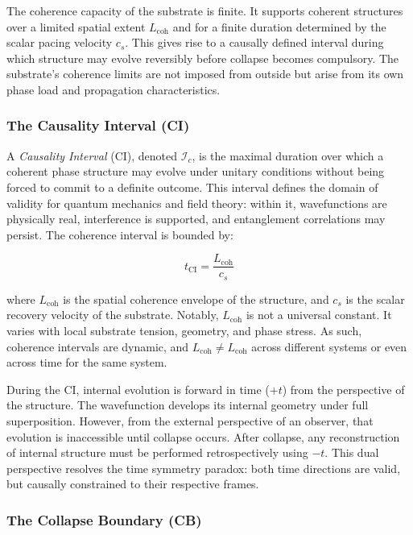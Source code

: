 \documentclass[preprints,article,submit,pdftex,moreauthors]{Definitions/mdpi}
\begin{document}
The coherence capacity of the substrate is finite. It supports coherent structures over a limited spatial extent \( L_{\text{coh}} \) and for a finite duration determined by the scalar pacing velocity \( c_s \). This gives rise to a causally defined interval during which structure may evolve reversibly before collapse becomes compulsory. The substrate’s coherence limits are not imposed from outside but arise from its own phase load and propagation characteristics.

\subsubsection{The Causality Interval (CI)}

A \textit{Causality Interval} (CI), denoted \( \mathcal{I}_c \), is the maximal duration over which a coherent phase structure may evolve under unitary conditions without being forced to commit to a definite outcome. This interval defines the domain of validity for quantum mechanics and field theory: within it, wavefunctions are physically real, interference is supported, and entanglement correlations may persist. The coherence interval is bounded by:

\[
t_{\text{CI}} = \frac{L_{\text{coh}}}{c_s}
\]

where \( L_{\text{coh}} \) is the spatial coherence envelope of the structure, and \( c_s \) is the scalar recovery velocity of the substrate. Notably, \( L_{\text{coh}} \) is not a universal constant. It varies with local substrate tension, geometry, and phase stress. As such, coherence intervals are dynamic, and \( L_{\text{coh}} \neq L_{\text{coh}} \) across different systems or even across time for the same system.

During the CI, internal evolution is forward in time (\( +t \)) from the perspective of the structure. The wavefunction develops its internal geometry under full superposition. However, from the external perspective of an observer, that evolution is inaccessible until collapse occurs. After collapse, any reconstruction of internal structure must be performed retrospectively using \( -t \). This dual perspective resolves the time symmetry paradox: both time directions are valid, but causally constrained to their respective frames.

\subsubsection{The Collapse Boundary (CB)}
\end{document}
